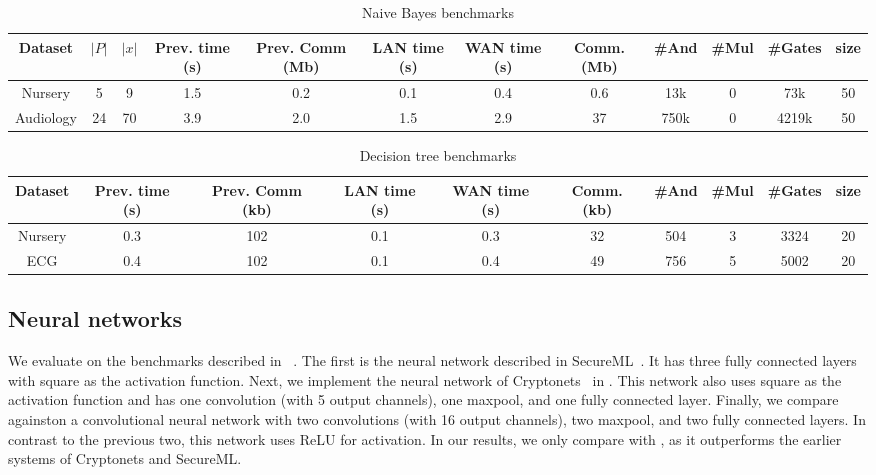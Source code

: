 \begin{table*}
\begin{tabular}{c|c|c|c|c|c |c|c|c|c|c|c}
Dataset & $|P|$ & $|x|$ & Prev. time (s) & Prev. Comm (Mb) & LAN time (s) & WAN time (s) & Comm. (Mb)  & \#And & \#Mul & \#Gates  & size\\
\hline
Nursery & 5 & 9 & 1.5 & 0.2 & 0.1 & 0.4 & 0.6 & 13k & 0 & 73k & 50\\
\hline
Audiology & 24 & 70 & 3.9 & 2.0 & 1.5 & 2.9 & 37 & 750k & 0 & 4219k & 50\\
\hline
\end{tabular}

 \caption{Naive Bayes benchmarks}
 \label{tab:lcd} 
\end{table*}

\begin{table*}
\begin{tabular}{c|c|c|c |c|c|c|c|c|c}
Dataset  & Prev. time (s) & Prev. Comm (kb) & LAN time (s) & WAN time (s) & Comm. (kb)  & \#And & \#Mul & \#Gates & size\\
\hline
Nursery &  0.3 & 102 & 0.1 & 0.3 & 32 & 504 & 3 & 3324 & 20\\
\hline
ECG &  0.4 & 102 & 0.1 & 0.4 & 49 & 756 & 5 & 5002 & 20\\
\hline
\end{tabular}

 \caption{Decision tree benchmarks}
 \label{tab:lcd} 
\end{table*}



\subsection{Neural networks}
We evaluate on the benchmarks described in \minion~\cite{minionn}.
The first is the neural network described in SecureML~\cite{secureml}.
It has three fully connected layers with square as the activation function.
Next, we implement the neural network of Cryptonets~\cite{cryptonets} in \tool.
This network also uses square as the activation function and has one convolution (with 5 output channels), one maxpool, and one fully connected layer.
Finally, we compare against\minion on a convolutional neural network
with two convolutions (with 16 output channels), two maxpool, and two fully connected layers.
In contrast to the previous two, this network uses ReLU for activation.
In our results, we only compare with \minion, as it outperforms the earlier systems of
Cryptonets and SecureML.

